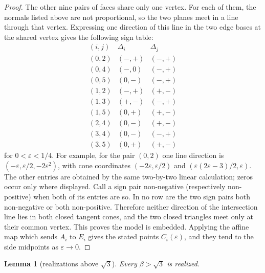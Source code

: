\documentclass[12pt]{article}
\newtheorem{lemma}{Lemma}
\begin{document}
\begin{proof}
The other nine pairs of faces share only one vertex.  For each of them,
the normals listed above are not proportional, so the two planes meet in a
line through that vertex.  Expressing one direction of this line in the two edge bases
at the shared vertex gives the following sign table:
\[
\begin{array}{c|c|c}
(i,j)&\Delta_i&\Delta_j\\ \hline
(0,2)&(-,+)&(-,+)\\
(0,4)&(-,0)&(-,+)\\
(0,5)&(0,-)&(-,+)\\
(1,2)&(-,+)&(+,-)\\
(1,3)&(+,-)&(-,+)\\
(1,5)&(0,+)&(+,-)\\
(2,4)&(0,-)&(+,-)\\
(3,4)&(0,-)&(-,+)\\
(3,5)&(0,+)&(+,-)
\end{array}
\]
for \(0<\varepsilon<1/4\).  For example, for the pair \((0,2)\)
one line direction is \((-\varepsilon,\varepsilon/2,-2\varepsilon^2)\),
with cone coordinates
\((-2\varepsilon,\varepsilon/2)\) and
\((\varepsilon(2\varepsilon-3)/2,\varepsilon)\).  The other entries are
obtained by the same two-by-two linear calculation; zeros occur only
where displayed.  Call a sign pair non-negative (respectively
non-positive) when both of its entries are so.  In no row are the two
sign pairs both non-negative or both non-positive.  Therefore neither direction of the intersection line
lies in both closed tangent cones, and the two closed triangles meet only
at their common vertex.  This proves the model is embedded.  Applying the affine map which sends \(A_i\) to \(E_i\) gives
the stated points \(C_i(\varepsilon)\), and they tend to the side
midpoints as \(\varepsilon\to0\).
\end{proof}

\begin{lemma}[realizations above \(\sqrt3\)]\label{lem:upper}
Every \(\beta>\sqrt3\) is realized.
\end{lemma}
\end{document}

